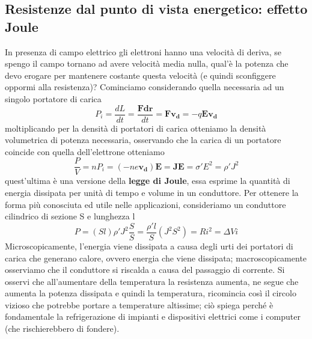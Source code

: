 \documentclass[10pt,a4paper]{article}
\begin{document}
\subsection{Resistenze dal punto di vista energetico: effetto Joule}
In presenza di campo elettrico gli elettroni hanno una velocità di deriva, se spengo il campo tornano ad avere velocità media nulla, qual'è la potenza che devo erogare per mantenere costante questa velocità (e quindi sconfiggere oppormi alla resistenza)? Cominciamo considerando quella necessaria ad un singolo portatore di carica
\[P_i = \frac{dL}{dt}= \frac{\mathbf{F}\mathbf{dr}}{dt}= \mathbf{F}\mathbf{v_d}= -q\mathbf{E}\mathbf{v_d}\] 
moltiplicando per la densità di portatori di carica otteniamo la densità volumetrica di potenza necessaria, osservando che la carica di un portatore coincide con quella dell'elettrone otteniamo
\[\frac{P}{V}= nP_i=  (-ne\mathbf{v_d})\mathbf{E}= \mathbf{J}\mathbf{E}= \sigma' E^2= \rho' J^2\]
quest'ultima è una versione della \textbf{legge di Joule}, essa esprime la quantità di energia dissipata per unità di tempo e volume in un conduttore. Per ottenere la forma più conosciuta ed utile nelle applicazioni, consideriamo un conduttore cilindrico di sezione S e lunghezza l
\[P = (Sl) \rho' J^2 \frac{S}{S} = \frac{\rho' l}{S}(J^2 S^2)= Ri^2= \Delta V i \]
Microscopicamente, l'energia viene dissipata a causa degli urti dei portatori di carica che generano calore, ovvero energia che viene dissipata; macroscopicamente osserviamo che il conduttore si riscalda a causa del passaggio di corrente. Si osservi che all'aumentare della temperatura la resistenza aumenta, ne segue che aumenta la potenza dissipata e quindi la temperatura, ricomincia così il circolo vizioso che potrebbe portare a temperature altissime; ciò spiega perché è fondamentale la refrigerazione di impianti e dispositivi elettrici come i computer (che rischierebbero di fondere).    
\end{document}
